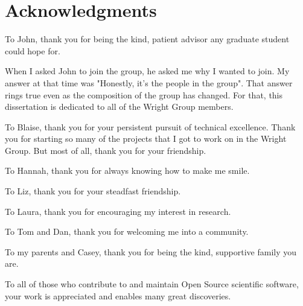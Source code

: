 \chapter*{Acknowledgments}

\singlespacing

To John, thank you for being the kind, patient advisor any graduate student could hope for.

When I asked John to join the group, he asked me why I wanted to join.
My answer at that time was "Honestly, it's the people in the group".
That answer rings true even as the composition of the group has changed.
For that, this dissertation is dedicated to all of the Wright Group members.

To Blaise, thank you for your persistent pursuit of technical excellence.
Thank you for starting so many of the projects that I got to work on in the Wright Group.
But most of all, thank you for your friendship.

To Hannah, thank you for always knowing how to make me smile.

To Liz, thank you for your steadfast friendship.

To Laura, thank you for encouraging my interest in research.

To Tom and Dan, thank you for welcoming me into a community.

To my parents and Casey, thank you for being the kind, supportive family you are.

To all of those who contribute to and maintain Open Source scientific software, your work is appreciated and enables many great discoveries. 
